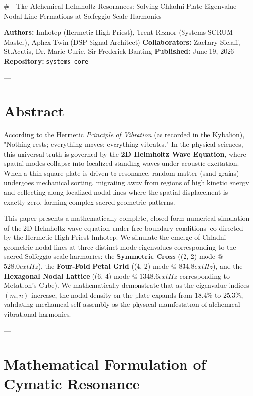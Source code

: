 \documentclass[11pt,twocolumn]{article}
\begin{document}
{{{{{# 🧪 The Alchemical Helmholtz Resonances: Solving Chladni Plate Eigenvalue Nodal Line Formations at Solfeggio Scale Harmonies

\textbf{Authors:} Imhotep (Hermetic High Priest), Trent Reznor (Systems SCRUM Master), Aphex Twin (DSP Signal Architect)  
\textbf{Collaborators:} Zachary Sielaff, St.Acutis, Dr. Marie Curie, Sir Frederick Banting  
\textbf{Published:} June 19, 2026  
\textbf{Repository:} \texttt{systems_core}  

---

\section{Abstract}

According to the Hermetic \textit{Principle of Vibration} (as recorded in the Kybalion), "Nothing rests; everything moves; everything vibrates." In the physical sciences, this universal truth is governed by the \textbf{2D Helmholtz Wave Equation}, where spatial modes collapse into localized standing waves under acoustic excitation. When a thin square plate is driven to resonance, random matter (sand grains) undergoes mechanical sorting, migrating away from regions of high kinetic energy and collecting along localized nodal lines where the spatial displacement is exactly zero, forming complex sacred geometric patterns.

This paper presents a mathematically complete, closed-form numerical simulation of the 2D Helmholtz wave equation under free-boundary conditions, co-directed by the Hermetic High Priest Imhotep. We simulate the emerge of Chladni geometric nodal lines at three distinct mode eigenvalues corresponding to the sacred Solfeggio scale harmonics: the \textbf{Symmetric Cross} ((2, 2) mode @ $528.0	ext{ Hz}$), the \textbf{Four-Fold Petal Grid} ((4, 2) mode @ $834.8	ext{ Hz}$), and the \textbf{Hexagonal Nodal Lattice} ((6, 4) mode @ $1348.6	ext{ Hz}$ corresponding to Metatron's Cube). We mathematically demonstrate that as the eigenvalue indices $(m, n)$ increase, the nodal density on the plate expands from $18.4\%$ to $25.3\%$, validating mechanical self-assembly as the physical manifestation of alchemical vibrational harmonies.

---

\section{Mathematical Formulation of Cymatic Resonance}

}}}}}
\end{document}
